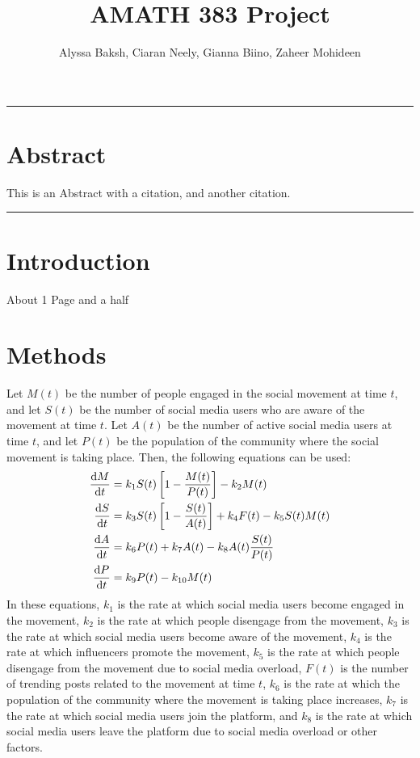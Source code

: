 \documentclass{article}
\title{AMATH 383 Project}
\author{
    Alyssa Baksh, 
    Ciaran Neely,
    Gianna Biino,
    Zaheer Mohideen
}
\begin{document}
    \maketitle
    
    \hrule
    \section{Abstract}
    This is an Abstract with a citation\cite{kaveh_defining_2020}, and another citation\cite{small_movements_2021}.
    \hrule
    \section{Introduction}
    About 1 Page and a half
    \section{Methods}
        Let $M(t)$ be the number of people engaged in the social movement at time $t$, and let $S(t)$ be the number of social media users who are aware of the movement at time $t$. Let $A(t)$ be the number of active social media users at time $t$, and let $P(t)$ be the population of the community where the social movement is taking place. Then, the following equations can be used:
        \begin{align}
            \diff Mt &= k_1 S(t) \left[1 - \frac{M(t)}{P(t)}\right] - k_2M(t)
            \\
            \diff St &= k_3 S(t)\left[1 - \frac{S(t)}{A(t)}\right] + k_4 F(t) - k_5 S(t)M(t)
            \\
            \diff At &= k_6 P(t) + k_7A(t) - k_8A(t)\frac{S(t)}{P(t)}
            \\
            \diff Pt &= k_9 P(t) - k_{10}M(t)
        \end{align}
        In these equations, $k_1$ is the rate at which social media users become engaged in the movement, $k_2$ is the rate at which people disengage from the movement, $k_3$ is the rate at which social media users become aware of the movement, $k_4$ is the rate at which influencers promote the movement, $k_5$ is the rate at which people disengage from the movement due to social media overload, $F(t)$ is the number of trending posts related to the movement at time $t$, $k_6$ is the rate at which the population of the community where the movement is taking place increases, $k_7$ is the rate at which social media users join the platform, and $k_8$ is the rate at which social media users leave the platform due to social media overload or other factors.
        
\end{document}

